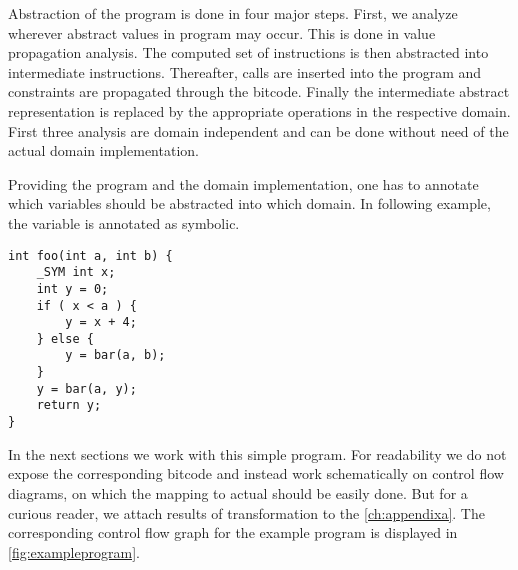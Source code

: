 Abstraction of the program is done in four major steps. First, we analyze
wherever abstract values in program may occur. This is done in value propagation
analysis. The computed set of instructions is then abstracted into intermediate
\LART instructions. Thereafter,  calls are inserted into the
program and constraints are propagated through the bitcode. Finally the
intermediate abstract representation is replaced by the appropriate operations
in the respective domain. First three analysis are domain independent and can be
done without need of the actual domain implementation.

Providing the program and the domain implementation, one has
to annotate which variables should be abstracted into which domain. In
following example, the variable  is annotated as symbolic.
\begin{verbatim}
int foo(int a, int b) {
    _SYM int x;
    int y = 0;
    if ( x < a ) {
        y = x + 4;
    } else {
        y = bar(a, b);
    }
    y = bar(a, y);
    return y;
}
\end{verbatim}
In the next sections we work with this simple \Cpp{} program. For
readability we do not expose the corresponding \LLVM bitcode and instead
work schematically on control flow diagrams, on which the mapping to actual
\LLVM should be easily done. But for a curious reader, we attach results of
\LLVM transformation to the \autoref{ch:appendixa}. The corresponding control
flow graph for the example program is displayed in \autoref{fig:exampleprogram}.


